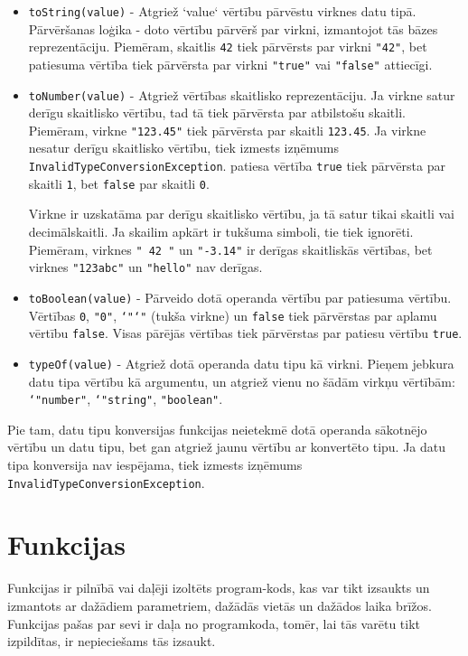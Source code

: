 \documentclass[12pt,a4paper]{report}
\begin{document}
\begin{itemize}
  \item \texttt{toString(value)} - Atgriež `value` vērtību pārvēstu virknes datu tipā.
  Pārvēršanas loģika - doto vērtību pārvērš par virkni, izmantojot tās bāzes reprezentāciju. Piemēram, skaitlis \texttt{42} tiek pārvērsts par virkni \texttt{"42"}, bet patiesuma vērtība tiek pārvērsta par virkni \texttt{"true"} vai \texttt{"false"} attiecīgi. 
  \item \texttt{toNumber(value)} - Atgriež vērtības skaitlisko reprezentāciju. Ja virkne satur derīgu skaitlisko vērtību, tad tā tiek pārvērsta par atbilstošu skaitli. Piemēram, virkne \texttt{"123.45"} tiek pārvērsta par skaitli \texttt{123.45}. Ja virkne nesatur derīgu skaitlisko vērtību, tiek izmests izņēmums \texttt{InvalidTypeConversionException}. patiesa vērtība \texttt{true} tiek pārvērsta par skaitli \texttt{1}, bet \texttt{false} par skaitli \texttt{0}. 
  
  Virkne ir uzskatāma par derīgu skaitlisko vērtību, ja tā satur tikai skaitli vai decimālskaitli. Ja skailim apkārt ir tukšuma simboli, tie tiek ignorēti. Piemēram, virknes \texttt{"  42  "} un \texttt{"-3.14"} ir derīgas skaitliskās vērtības, bet virknes \texttt{"123abc"} un \texttt{"hello"} nav derīgas.
  \item \texttt{toBoolean(value)} - Pārveido dotā operanda vērtību par patiesuma vērtību. Vērtības \texttt{0}, \texttt{"0"}, \texttt{\char`"\char`"} (tukša virkne) un \texttt{false} tiek pārvērstas par aplamu vērtību \texttt{false}. Visas pārējās vērtības tiek pārvērstas par patiesu vērtību \texttt{true}.
  \item \texttt{typeOf(value)} - Atgriež dotā operanda datu tipu kā virkni. Pieņem jebkura datu tipa vērtību kā argumentu, un atgriež vienu no šādām virkņu vērtībām: \texttt{\char`"number"}, \texttt{\char`"string"}, \texttt{"boolean"}.
\end{itemize}

Pie tam, datu tipu konversijas funkcijas neietekmē dotā operanda sākotnējo vērtību un datu tipu, bet gan atgriež jaunu vērtību ar konvertēto tipu. Ja datu tipa konversija nav iespējama, tiek izmests izņēmums \texttt{InvalidTypeConversionException}.


\section{Funkcijas}
\label{section:functions}

Funkcijas ir pilnībā vai daļēji izoltēts program-kods, kas var tikt izsaukts un izmantots ar dažādiem parametriem, dažādās vietās un dažādos laika brīžos. Funkcijas pašas par sevi ir daļa no programkoda, tomēr, lai tās varētu tikt izpildītas, ir nepieciešams tās izsaukt. 
\end{document}
